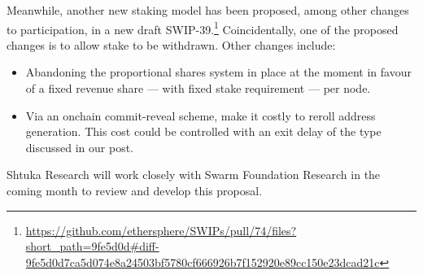 Meanwhile, another new staking model has been proposed, among other changes to participation, in a new draft SWIP-39.\footnote{\url{https://github.com/ethersphere/SWIPs/pull/74/files?short_path=9fe5d0d\#diff-9fe5d0d7ca5d074e8a24503bf5780cf666926b7f152920e89cc150e23dcad21c}}
%
Coincidentally, one of the proposed changes is to allow stake to be withdrawn.
%
Other changes include:
%
\begin{itemize}
  \item Abandoning the proportional shares system in place at the moment in favour of a fixed revenue share --- with fixed stake requirement --- per node.
  \item Via an onchain commit-reveal scheme, make it costly to reroll address generation. This cost could be controlled with an exit delay of the type discussed in our post.
\end{itemize}
%
Shtuka Research will work closely with Swarm Foundation Research in the coming month to review and develop this proposal.
